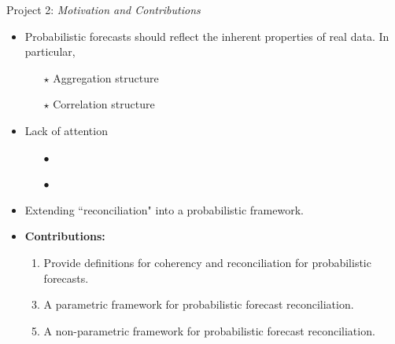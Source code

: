 \documentclass[11pt,xcolor=dvipsnames,table]{beamer} %
\begin{document}
\begin{frame}[noframenumbering]{Project 2: \textit{Motivation and Contributions}}
\begin{itemize}[<+-| alert@+>]
			\item Probabilistic forecasts should reflect the inherent properties of real data. In particular, 
			\begin{itemize}[<+-| alert@+>]
				\item[$\star$] Aggregation structure
				\item[$\star$] Correlation structure
			\end{itemize}
			\item Lack of attention
				\begin{itemize}[<+-| alert@+>]
					\item[$\bullet$] \citet{BenTaieb2017}
					\item[$\bullet$] \citet{Jeon2018}
			\end{itemize}
		\item Extending ``reconciliation" into a probabilistic framework.
		\item[]
					
	\item \textbf{\color{Maroon}Contributions:} 
	\begin{enumerate}
		\item Provide definitions for coherency and reconciliation for probabilistic forecasts.
		\item[]
		\item A parametric framework for probabilistic forecast reconciliation.
		\item[]
		\item A non-parametric framework for probabilistic forecast reconciliation.
	\end{enumerate}	
	\item[]
	
\end{itemize}    
\end{frame}


%	
\end{document}
